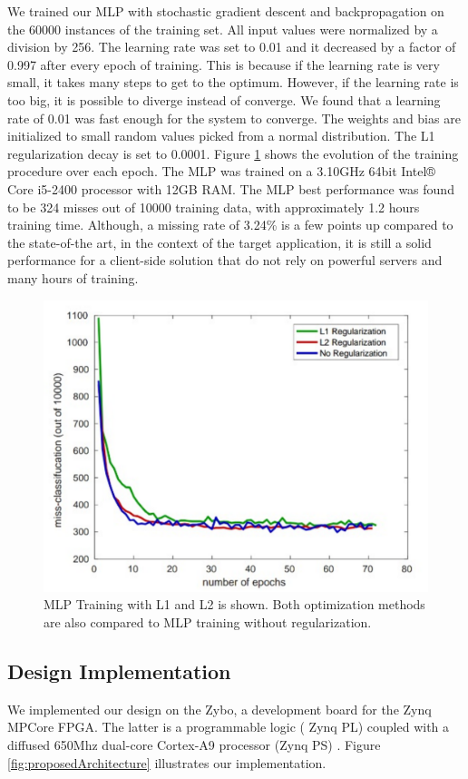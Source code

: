 \documentclass[sigconf]{acmart}
\theoremstyle{plain}
\theoremstyle{remark}
\begin{document}
We trained our MLP with stochastic gradient descent and backpropagation on the 60000 instances of the training set. All input values were normalized by a division by 256. The learning rate was set to 0.01 and it decreased by a factor of 0.997 after every epoch of training. This is because if the learning rate is very small, it takes many steps to get to the optimum. However, if the learning rate is too big, it is possible to diverge instead of converge. We found that a learning rate of 0.01 was fast enough for the system to converge. The weights and bias are initialized to small random values picked from a normal distribution. The L1 regularization decay is set to 0.0001. Figure \ref{fig:misses} shows the evolution of the training procedure over each epoch. The MLP was trained on a 3.10GHz 64bit Intel® Core i5-2400 processor with 12GB RAM. The MLP best performance was found to be 324 misses out of 10000 training data, with approximately 1.2 hours training time. Although, a missing rate of 3.24\% is a few points up compared to the state-of-the art, in the context of the target application, it is still a solid performance for a client-side solution that do not rely on powerful servers and many hours of training.


\begin{figure} [hbt]
\centering
\includegraphics[width=0.85\linewidth]{misses.pdf}
\caption{MLP Training with L1 and L2 is shown. Both optimization methods are also compared to MLP training without regularization. }
\label{fig:misses}
\end{figure}

\subsection{Design Implementation}
We implemented our design on the Zybo, a development board for the Zynq MPCore FPGA. The latter is a programmable logic ( Zynq PL) coupled with a diffused 650Mhz dual-core Cortex-A9 processor (Zynq PS) \cite{xilinxzynq}. Figure \ref{fig:proposedArchitecture} illustrates our implementation. 
\end{document}
